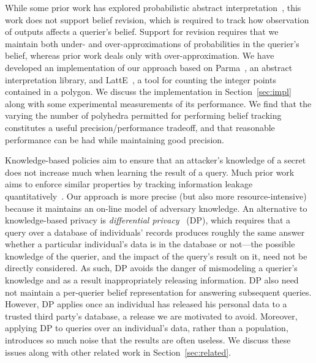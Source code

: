 While some prior work has explored probabilistic abstract
interpretation~\cite{monniaux00prob}, this work does not support
belief revision, which is required to track how observation of outputs
affects a querier's belief.  Support for revision requires that we
maintain both under- and over-approximations of probabilities in the querier's belief,
whereas prior work deals only with over-approximation.  We have
developed an implementation of our approach based on
Parma~\cite{parma}, an abstract interpretation library, and
LattE~\cite{latte}, a tool for counting the integer points contained
in a polygon.  We discuss the implementation in Section~\ref{sec:impl}
along with some experimental measurements of its performance.  We find
that the varying the number of polyhedra permitted for performing
belief tracking constitutes a useful precision/performance tradeoff,
and that reasonable performance can be had while maintaining good
precision.

Knowledge-based policies aim to ensure that an attacker's knowledge of
a secret does not increase much when learning the result of a query.
Much prior work aims to enforce similar properties by tracking
information leakage quantitatively~\cite{McCamantE2008,
  smith09foundations, backes09automatic, kopf:rybalchenko,
  rastogi09relationship}. Our approach is more precise (but also more
resource-intensive) because it maintains an on-line model of adversary
knowledge.  An alternative to knowledge-based privacy is
\emph{differential privacy}~\cite{diffpriv} (DP), which requires that
a query over a database of individuals' records produces roughly the
same answer whether a particular individual's data is in the database
or not---the possible knowledge of the querier, and the impact of the
query's result on it, need not be directly considered.  As such, DP
avoids the danger of mismodeling a querier's knowledge and as a result
inappropriately releasing information.  DP also need not maintain a
per-querier belief representation for answering subsequent queries.
However, DP applies once an individual has released his personal data
to a trusted third party's database, a release we are motivated to
avoid. Moreover, applying DP to queries over an individual's data,
rather than a population, introduces so much noise that the results
are often useless.  We discuss these issues along with other related
work in Section~\ref{sec:related}.

